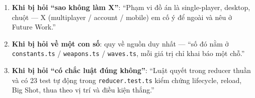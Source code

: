 \documentclass[12pt,a4paper]{article}
\begin{document}
\begin{enumerate}[leftmargin=*]
  \item \textbf{Khi bị hỏi ``sao không làm X''}: ``Phạm vi đồ án là single-player,
        desktop, chuột --- X (multiplayer / account / mobile) em cố ý để ngoài và
        nêu ở Future Work.''
  \item \textbf{Khi bị hỏi về một con số}: quy về nguồn duy nhất ---
        ``số đó nằm ở \texttt{constants.ts} / \texttt{weapons.ts} / \texttt{waves.ts},
        mỗi giá trị chỉ khai báo một chỗ.''
  \item \textbf{Khi bị hỏi ``có chắc luật đúng không''}: ``Luật quyết trong reducer
        thuần và có 23 test tự động trong \texttt{reducer.test.ts} kiểm chứng
        lifecycle, reload, Big Shot, thua theo vị trí và điều kiện thắng.''
\end{enumerate}
\end{document}
